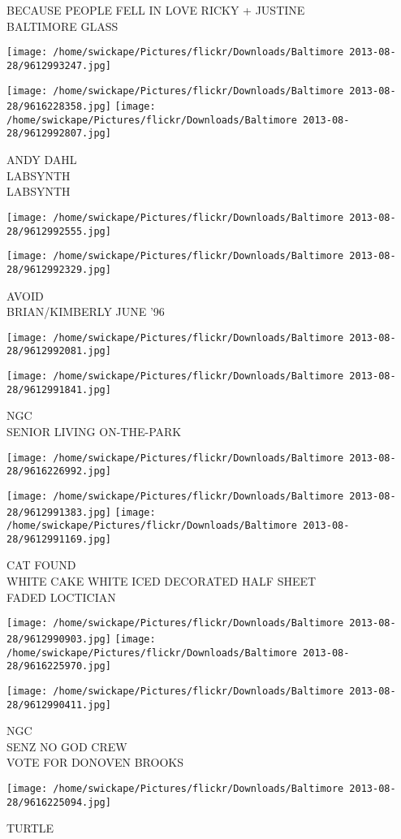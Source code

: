 \documentclass[10pt,letterpaper]{article}
\begin{document}
BECAUSE PEOPLE FELL IN LOVE RICKY + JUSTINE\\
BALTIMORE GLASS
\pagebreak

\texttt{[image: /home/swickape/Pictures/flickr/Downloads/Baltimore 2013-08-28/9612993247.jpg]}

\vspace{0.25in}
\texttt{[image: /home/swickape/Pictures/flickr/Downloads/Baltimore 2013-08-28/9616228358.jpg]}
\texttt{[image: /home/swickape/Pictures/flickr/Downloads/Baltimore 2013-08-28/9612992807.jpg]}

ANDY DAHL\\
LABSYNTH\\
LABSYNTH
\pagebreak

\texttt{[image: /home/swickape/Pictures/flickr/Downloads/Baltimore 2013-08-28/9612992555.jpg]}

\vspace{0.25in}
\texttt{[image: /home/swickape/Pictures/flickr/Downloads/Baltimore 2013-08-28/9612992329.jpg]}

AVOID\\
BRIAN/KIMBERLY JUNE '96
\pagebreak

\texttt{[image: /home/swickape/Pictures/flickr/Downloads/Baltimore 2013-08-28/9612992081.jpg]}

\vspace{0.25in}
\texttt{[image: /home/swickape/Pictures/flickr/Downloads/Baltimore 2013-08-28/9612991841.jpg]}

NGC\\
SENIOR LIVING ON{-}THE{-}PARK
\pagebreak

\texttt{[image: /home/swickape/Pictures/flickr/Downloads/Baltimore 2013-08-28/9616226992.jpg]}

\vspace{0.25in}
\texttt{[image: /home/swickape/Pictures/flickr/Downloads/Baltimore 2013-08-28/9612991383.jpg]}
\texttt{[image: /home/swickape/Pictures/flickr/Downloads/Baltimore 2013-08-28/9612991169.jpg]}

CAT FOUND\\
WHITE CAKE WHITE ICED DECORATED HALF SHEET\\
FADED LOCTICIAN
\pagebreak

\texttt{[image: /home/swickape/Pictures/flickr/Downloads/Baltimore 2013-08-28/9612990903.jpg]}
\texttt{[image: /home/swickape/Pictures/flickr/Downloads/Baltimore 2013-08-28/9616225970.jpg]}

\vspace{0.25in}
\texttt{[image: /home/swickape/Pictures/flickr/Downloads/Baltimore 2013-08-28/9612990411.jpg]}

NGC\\
SENZ NO GOD CREW\\
VOTE FOR DONOVEN BROOKS
\pagebreak

\texttt{[image: /home/swickape/Pictures/flickr/Downloads/Baltimore 2013-08-28/9616225094.jpg]}

TURTLE
\pagebreak
\end{document}

